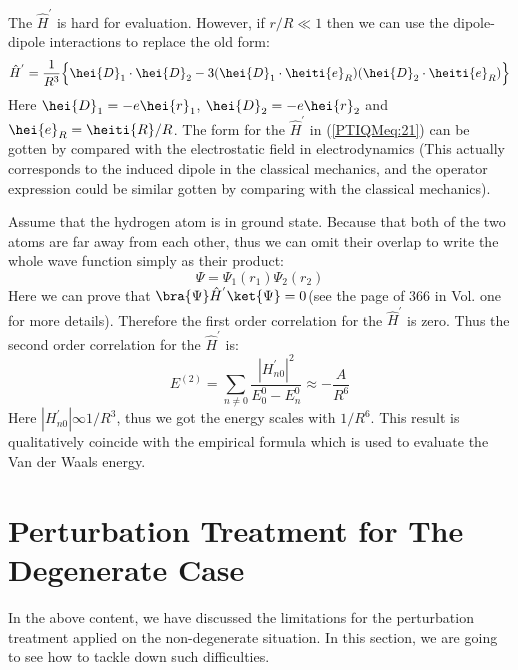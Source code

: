 The $\hat{H}^{'}$ is hard for evaluation. However, if $r/R \ll 1$
then we can use the dipole-dipole interactions to replace the old
form:
\begin{equation}\label{PTIQMeq:21}
\hat{H}^{'} = \frac{1}{R^{3}}\Big\{\hei{D}_{1}\cdot\hei{D}_{2}
-3(\hei{D}_{1}\cdot\heiti{e}_{R})(\hei{D}_{2}\cdot\heiti{e}_{R})\Big\}
\end{equation}
Here $\hei{D}_{1} = -e\hei{r}_{1}$, $\hei{D}_{2} = -e\hei{r}_{2}$
and $\hei{e}_{R} = \heiti{R}/R$. The form for the $\hat{H}^{'}$ in
(\ref{PTIQMeq:21}) can be gotten by compared with the electrostatic
field in electrodynamics (This actually corresponds to the induced
dipole in the classical mechanics, and the operator expression could
be similar gotten by comparing with the classical mechanics).

Assume that the hydrogen atom is in ground state. Because that both
of the two atoms are far away from each other, thus we can omit
their overlap to write the whole wave function simply as their
product:
\begin{equation}\label{}
\Psi = \Psi_{1} (r_{1})\Psi_{2} (r_{2})
\end{equation}
Here we can prove that $\bra{\Psi}\hat{H}^{'}\ket{\Psi} = 0$(see the
page of 366 in \cite{ZengJinYan} Vol. one for more details).
Therefore the first order correlation for the $\hat{H}^{'}$ is zero.
Thus the second order correlation for the $\hat{H}^{'}$ is:
\begin{equation}\label{}
E^{(2)} = \sum_{n\neq 0}\frac{|H^{'}_{n0}|^{2}}{E^{0}_{0} -
E^{0}_{n}} \approx -\frac{A}{R^{6}}
\end{equation}
Here $|H^{'}_{n0}| \infty 1/R^{3}$, thus we got the energy scales
with $1/R^{6}$. This result is qualitatively coincide with the
empirical formula which is used to evaluate the Van der Waals
energy.


\section{Perturbation Treatment for The Degenerate Case}
%
%
In the above content, we have discussed the limitations for the
perturbation treatment applied on the non-degenerate situation. In
this section, we are going to see how to tackle down such
difficulties.


